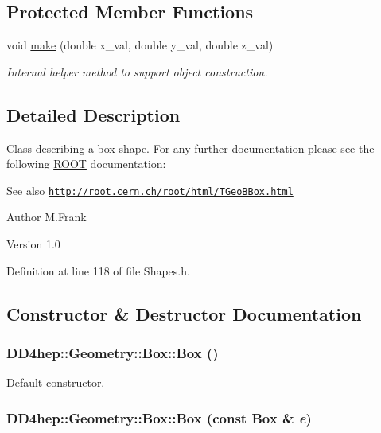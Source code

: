 \subsection*{Protected Member Functions}
\begin{DoxyCompactItemize}
\item 
void \hyperlink{class_d_d4hep_1_1_geometry_1_1_box_a063e53830dac233cfbd25c20772fc634}{make} (double x\_\-val, double y\_\-val, double z\_\-val)
\begin{DoxyCompactList}\small\item\em Internal helper method to support object construction. \item\end{DoxyCompactList}\end{DoxyCompactItemize}


\subsection{Detailed Description}
Class describing a box shape. For any further documentation please see the following \hyperlink{namespace_r_o_o_t}{ROOT} documentation: \begin{DoxySeeAlso}{See also}
\href{http://root.cern.ch/root/html/TGeoBBox.html}{\tt http://root.cern.ch/root/html/TGeoBBox.html}
\end{DoxySeeAlso}
\begin{DoxyAuthor}{Author}
M.Frank 
\end{DoxyAuthor}
\begin{DoxyVersion}{Version}
1.0 
\end{DoxyVersion}


Definition at line 118 of file Shapes.h.

\subsection{Constructor \& Destructor Documentation}
\hypertarget{class_d_d4hep_1_1_geometry_1_1_box_a62e8d6aff0c4e7f4d7ee515b117cca29}{
\subsubsection[{Box}]{\setlength{\rightskip}{0pt plus 5cm}DD4hep::Geometry::Box::Box ()}}
\label{class_d_d4hep_1_1_geometry_1_1_box_a62e8d6aff0c4e7f4d7ee515b117cca29}


Default constructor. \hypertarget{class_d_d4hep_1_1_geometry_1_1_box_a25efab40f6803be3f4a803c0aaa536bf}{
\subsubsection[{Box}]{\setlength{\rightskip}{0pt plus 5cm}DD4hep::Geometry::Box::Box (const {\bf Box} \& {\em e})}}
\label{class_d_d4hep_1_1_geometry_1_1_box_a25efab40f6803be3f4a803c0aaa536bf}


